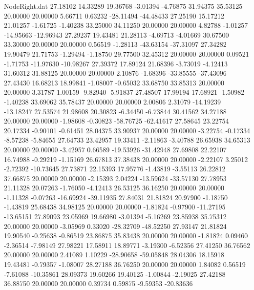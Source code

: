 \begin{filecontents}{NodeRight.dat}
  27.18102   14.33289   19.36768    -3.01394   -4.76875   31.94375   35.53125   20.00000   20.00000    5.66711    0.63232  -28.11494  -44.48433
  27.25190   15.17212   21.01257    -1.61725   -1.40238   33.25000   34.11250   20.00000   20.00000    4.82788   -1.01257  -14.95663  -12.96943
  27.29237   19.43481   21.28113    -4.69713   -4.01669   30.67500   33.30000   20.00000   20.00000    0.56519   -1.28113  -43.63154  -37.31097
  27.34282   19.90479   21.71753    -1.29494   -1.18750   29.77500   32.45312   20.00000   20.00000    0.09521   -1.71753  -11.97630  -10.98267
  27.39372   17.89124   21.68396    -3.73019   -4.12413   31.60312   31.88125   20.00000   20.00000    2.10876   -1.68396  -33.85555  -37.43096
  27.43430   16.68213   18.99841    -1.08007   -0.65032   33.68750   33.85313   20.00000   20.00000    3.31787    1.00159   -9.82940   -5.91837
  27.48507   17.99194   17.68921    -1.50982   -1.40238   33.69062   35.78437   20.00000   20.00000    2.00806    2.31079  -14.19239  -13.18247
  27.53574   21.98608   20.30823    -6.34450   -6.73844   30.41562   34.27188   20.00000   20.00000   -1.98608   -0.30823  -58.76725  -62.41617
  27.58645   23.22754   20.17334    -0.90101   -0.61451   28.04375   33.90937   20.00000   20.00000   -3.22754   -0.17334   -8.57238   -5.84655
  27.64733   23.42957   19.33411    -2.11863   -3.40788   26.65938   34.65313   20.00000   20.00000   -3.42957    0.66589  -19.53926  -31.42948
  27.69808   22.22107   16.74988    -0.29219   -1.15169   26.67813   37.38438   20.00000   20.00000   -2.22107    3.25012   -2.72392  -10.73645
  27.73871   22.15393   17.95776    -1.43819   -3.55113   26.22812   37.66875   20.00000   20.00000   -2.15393    2.04224  -13.59624  -33.57130
  27.78953   21.11328   20.07263    -1.76050   -4.12413   26.53125   36.16250   20.00000   20.00000   -1.11328   -0.07263  -16.69924  -39.11935
  27.84031   21.81824   20.97900    -1.18750   -1.43819   25.68438   34.98125   20.00000   20.00000   -1.81824   -0.97900  -11.27195  -13.65151
  27.89093   23.05969   19.66980    -3.01394   -5.16269   23.85938   35.75312   20.00000   20.00000   -3.05969    0.33020  -28.32709  -48.52250
  27.93147   21.81824   19.90540    -0.25638   -0.86519   23.86875   35.83438   20.00000   20.00000   -1.81824    0.09460   -2.36514   -7.98149
  27.98221   17.58911   18.89771    -3.19300   -6.52356   27.41250   36.76562   20.00000   20.00000    2.41089    1.10229  -28.90658  -59.05848
  28.04306   18.15918   19.43481    -0.79357   -1.08007   28.27188   36.76250   20.00000   20.00000    1.84082    0.56519   -7.61088  -10.35861
  28.09373   19.60266   19.40125    -1.00844   -2.19025   27.42188   36.88750   20.00000   20.00000    0.39734    0.59875   -9.59353  -20.83636

\end{filecontents}
